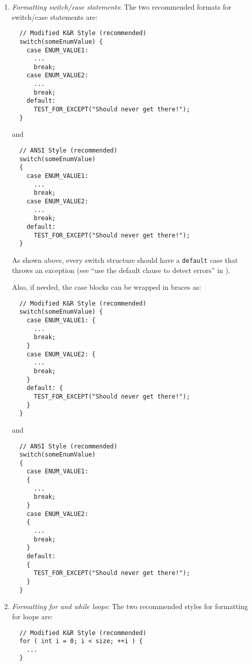 \begin{enumerate}
\begin{enumerate}
  {}\item\textit{Formatting switch/case statements}:
  The two recommended formats for switch/case statements are:

  {\small\begin{verbatim}
  // Modified K&R Style (recommended)
  switch(someEnumValue) {
    case ENUM_VALUE1:
      ...
      break;
    case ENUM_VALUE2:
      ...
      break;
    default:
      TEST_FOR_EXCEPT("Should never get there!");
  }
  \end{verbatim}}

  {}\noindent{}and

  {\small\begin{verbatim}
  // ANSI Style (recommended)
  switch(someEnumValue)
  {
    case ENUM_VALUE1:
      ...
      break;
    case ENUM_VALUE2:
      ...
      break;
    default:
      TEST_FOR_EXCEPT("Should never get there!");
  }
  \end{verbatim}}

  As shown above, every switch structure should have a {}\texttt{default} case
  that throws an exception (see ``use the default clause to detect errors''
  in {}\cite[Section 15.1]{CodeComplete2nd04}).

  Also, if needed, the case blocks can be wrapped in braces as:

  {\small\begin{verbatim}
  // Modified K&R Style (recommended)
  switch(someEnumValue) {
    case ENUM_VALUE1: {
      ...
      break;
    }
    case ENUM_VALUE2: {
      ...
      break;
    }    
    default: {
      TEST_FOR_EXCEPT("Should never get there!");
    }
  }
  \end{verbatim}}

  {}\noindent{}and

  {\small\begin{verbatim}
  // ANSI Style (recommended)
  switch(someEnumValue)
  {
    case ENUM_VALUE1:
    {
      ...
      break;
    }
    case ENUM_VALUE2:
    {
      ...
      break;
    }    
    default:
    {
      TEST_FOR_EXCEPT("Should never get there!");
    }
  }
  \end{verbatim}}

  {}\item\textit{Formatting for and while loops}: The two recommended styles
  for formatting for loops are:

  {\small\begin{verbatim}
  // Modified K&R Style (recommended)
  for ( int i = 0; i < size; ++i ) {
    ...
  }
  \end{verbatim}}


\end{enumerate}
\end{enumerate}
